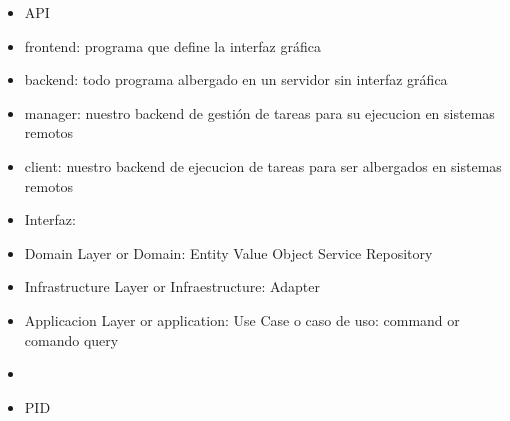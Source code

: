 \begin{itemize}
	\item API
	\item frontend: programa que define la interfaz gráfica
	\item backend: todo programa albergado en un servidor sin interfaz gráfica
	\item manager: nuestro backend de gestión de tareas para su ejecucion en sistemas remotos
	\item client: nuestro backend de ejecucion de tareas para ser albergados en sistemas remotos
	\item Interfaz:
	\item Domain Layer or Domain:
		\subitem Entity
		\subitem Value Object
		\subitem Service
		\subitem Repository
	\item Infrastructure Layer or Infraestructure:
		\subitem Adapter
	\item Applicacion Layer or application:
		\subitem Use Case o caso de uso:
		\subitem command or comando
		\subitem query
	\item
	\item PID
\end{itemize} 